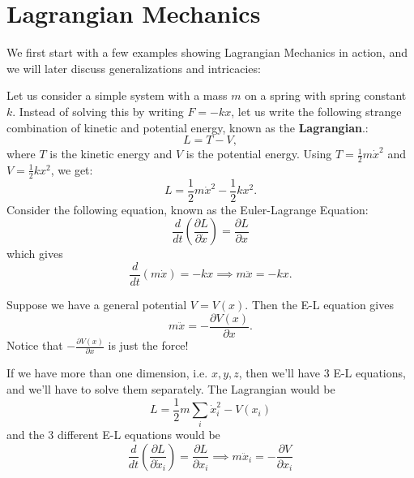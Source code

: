 \documentclass{article}
\numberwithin{equation}{section}
\begin{document}
\section{Lagrangian Mechanics}
We first start with a few examples showing Lagrangian Mechanics in action, and we will later discuss generalizations and intricacies:
\begin{example}
    Let us consider a simple system with a mass $m$ on a spring with spring constant $k$. Instead of solving this by writing $F=-kx$, let us write the following strange combination of kinetic and potential energy, known as the \textbf{Lagrangian}.:
    \begin{equation}
        L = T - V,
    \end{equation}
    where $T$ is the kinetic energy and $V$ is the potential energy. Using $T=\frac{1}{2}m\dot{x}^2$ and $V=\frac{1}{2}kx^2$, we get:
    \begin{equation}
        L = \frac{1}{2}m\dot{x}^2 - \frac{1}{2}kx^2.
    \end{equation}
    Consider the following equation, known as the Euler-Lagrange Equation:
    \begin{equation}
        \frac{d}{dt}\left(\frac{\partial L}{\partial \dot{x}}\right) = \frac{\partial L}{\partial x}
    \end{equation}
    which gives 
    \begin{equation}
        \frac{d}{dt}\left(m\dot{x}\right) = -kx \implies m\ddot{x} = -kx.
    \end{equation}
\end{example}
\begin{example}
    Suppose we have a general potential $V=V(x).$ Then the E-L equation gives
    \begin{equation}
        m\ddot{x} = -\frac{\partial V(x)}{\partial x}.
    \end{equation}
    Notice that $-\frac{\partial V(x)}{\partial x}$ is just the force!
\end{example}
If we have more than one dimension, i.e. $x,y,z$, then we'll have 3 E-L equations, and we'll have to solve them separately. The Lagrangian would be 
\begin{equation}
    L = \frac{1}{2}m\sum_i \dot{x}_i^2 - V(x_i)
\end{equation}
and the 3 different E-L equations would be
\begin{equation}
    \frac{d}{dt}\left(\frac{\partial L}{\partial \dot{x}_i}\right) = \frac{\partial L}{\partial x_i} \implies m\ddot{x}_i = -\frac{\partial V}{\partial x_i}
\end{equation}
\end{document}
